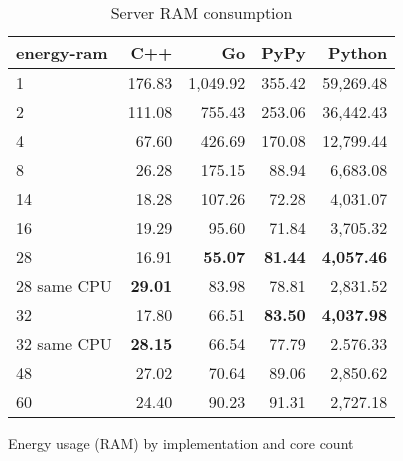 \begin{table}[H]
    \centering
    \begin{tabular}{lrrrr}
        \hline
        energy-ram   & C++             & Go                & PyPy                & Python            \\
        \hline      
        1            &   176.83        & 1,049.92          &   355.42            &  59,269.48        \\
        2            &   111.08        &   755.43          &   253.06            &  36,442.43        \\
        4            &    67.60        &   426.69          &   170.08            &  12,799.44        \\
        8	           &    26.28 	     &   175.15          &    88.94            &	  6,683.08       \\
        14           &    18.28        &   107.26          &    72.28            &   4,031.07        \\
        16           &    19.29        &    95.60          &    71.84            &   3,705.32        \\
        28           &    16.91        &    \textbf{55.07} &    \textbf{81.44}   & \textbf{4,057.46} \\
        28 same CPU  & \textbf{29.01}  &    83.98          &    78.81            &   2,831.52        \\
        32           &    17.80        &    66.51          &    \textbf{83.50}   & \textbf{4,037.98} \\
        32 same CPU  & \textbf{28.15}  &    66.54          &    77.79            &   2.576.33        \\
        48           &    27.02        &    70.64          &    89.06            &   2,850.62        \\
        60           &    24.40        &    90.23          &    91.31            &   2,727.18        \\
        \hline
    \end{tabular}
\caption{Server RAM consumption}{Energy usage (RAM) by implementation and core count}
\label{tab:server-energy-ram}
\end{table}

